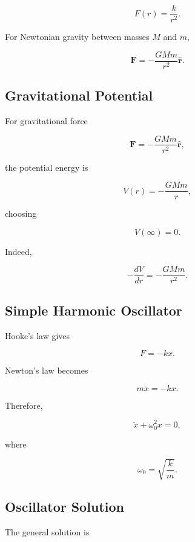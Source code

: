 \[
\boxed{
F(r)
=
\frac{k}{r^2}.
}
\]

For Newtonian gravity between masses \(M\) and \(m\),

\[
\boxed{
\mathbf{F}
=
-\frac{GMm}{r^2}
\hat{\mathbf{r}}.
}
\]

\subsection{Gravitational Potential}
\label{subsec:newtonian-gravitational-potential}

For gravitational force

\[
\mathbf{F}
=
-\frac{GMm}{r^2}\hat{\mathbf{r}},
\]

the potential energy is

\[
\boxed{
V(r)
=
-\frac{GMm}{r},
}
\]

choosing

\[
V(\infty)=0.
\]

Indeed,

\[
-\frac{dV}{dr}
=
-\frac{GMm}{r^2}.
\]

\subsection{Simple Harmonic Oscillator}
\label{subsec:simple-harmonic-oscillator}

Hooke's law gives

\[
\boxed{
F=-kx.
}
\]

Newton's law becomes

\[
m\ddot{x}
=
-kx.
\]

Therefore,

\[
\boxed{
\ddot{x}
+
\omega_0^2x
=
0,
}
\]

where

\[
\boxed{
\omega_0
=
\sqrt{\frac{k}{m}}.
}
\]

\subsection{Oscillator Solution}
\label{subsec:harmonic-oscillator-solution}

The general solution is

